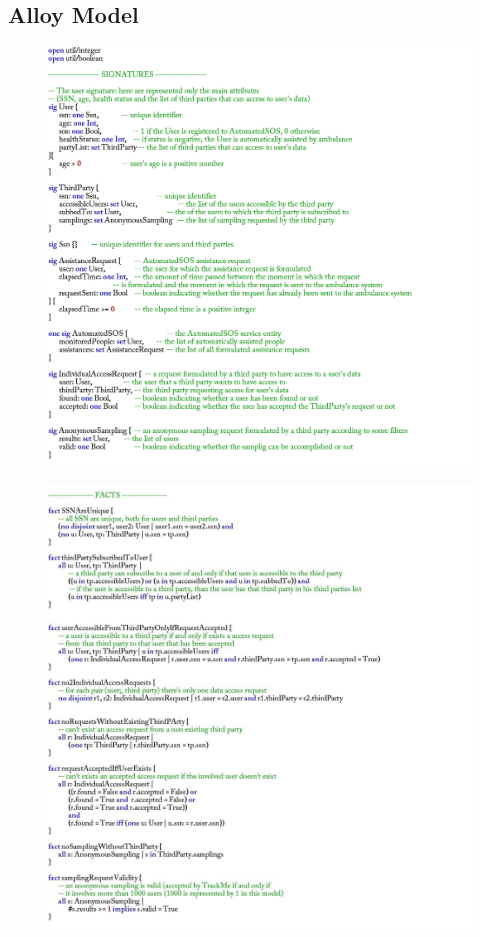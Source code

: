 \documentclass[12pt,a4paper]{article}
\begin{document}
		\subsection{Alloy Model}
			\begin{figure}[H]
				\centering
				\includegraphics[width=1.4\linewidth]{Images/signatures}
				\label{fig:signatures}
			\end{figure}
			\begin{figure}[H]
				\centering
				\includegraphics[width=1.3\linewidth]{Images/facts1}
				\label{fig:facts1}
			\end{figure}
\end{document}
